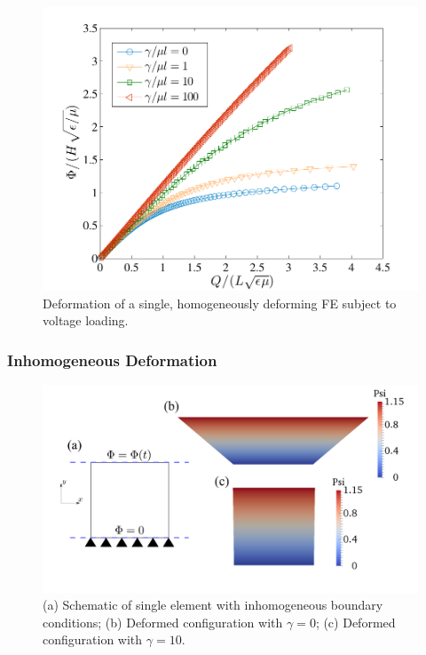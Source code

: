 \documentclass[final,authoryear,3p,times,twocolumn]{elsarticle}
\begin{document}
\begin{figure} \begin{center} 
\includegraphics[scale=0.7]{pics/voltage_hom.pdf}
\caption{Deformation of a single, homogeneously deforming FE subject to voltage loading.}
\label{homo} \end{center} \end{figure}

\subsubsection{Inhomogeneous Deformation}

\begin{figure} \begin{center} 
\includegraphics[scale=0.25]{pics/inhomo3.pdf}
\caption{(a) Schematic of single element with inhomogeneous boundary conditions; (b) Deformed configuration with $\gamma=0$; (c) Deformed configuration with $\gamma=10$.}
\label{inhomo3} \end{center} \end{figure}
\end{document}
